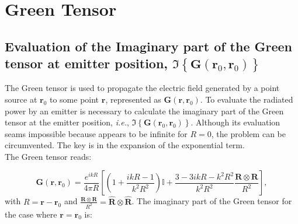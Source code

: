 \chapter{Green Tensor}

\section{Evaluation of the Imaginary part of the Green tensor at emitter position, $\Im\left\{\mathbf{G}\left(\mathbf{r}_{0},\mathbf{r}_{0}\right)\right\}$\label{App:green_at_origin}}

The Green tensor is used to propagate the electric field generated by a point source at $\mathbf{r}_{0}$ to some point $\mathbf{r}$, represented as $\mathbf{G}\left(\mathbf{r},\mathbf{r}_{0}\right)$. To evaluate the radiated power by an emitter is necessary to calculate the imaginary part of the Green tensor at the emitter position, \textit{i.e.}, $\Im\left\{\mathbf{G}\left(\mathbf{r}_{0},\mathbf{r}_{0}\right)\right\}$. Although its evaluation seams impossible because appears to be infinite for $R = 0$, the problem can be circumvented. The key is in the expansion of the exponential term.\\
The Green tensor reads:

\begin{equation}
\mathbf{G}\left(\mathbf{r},\mathbf{r}_{0}\right) = \frac{e^{ikR}}{4\pi R}\left[\left(1+\frac{ikR-1}{k^2R^2}\right)\mathbb{I}+\frac{3-3ikR-k^2R^2}{k^2R^2}\frac{\mathbf{R} \otimes\mathbf{R}}{R^2}\right],
\end{equation}
with $R = \mathbf{r}-\mathbf{r}_{0}$ and $\frac{\mathbf{R} \otimes\mathbf{R}}{R^2} = \hat{\mathbf{R}}\otimes \hat{\mathbf{R}}$.
The imaginary part of the Green tensor for the case where $\mathbf{r} = \mathbf{r}_{0}$ is:

